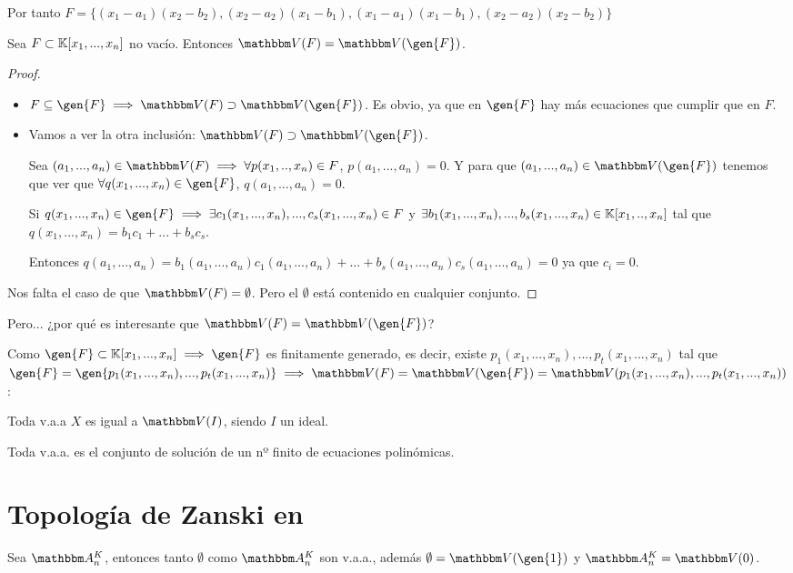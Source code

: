 \begin{example}
\begin{enumerate}
		Por tanto $F=\{ (x_1-a_1)(x_2-b_2), (x_2-a_2)(x_1-b_1), (x_1-a_1)(x_1-b_1), (x_2-a_2)(x_2-b_2)  \}$
	\end{enumerate}
\end{example}


\begin{prop}
	Sea $F \subset \mathbb{K}[x_1,...,x_n]$ no vacío. Entonces $\V(F)=\V(\gen{F})$.
\end{prop} 

\begin{proof}
	\begin{itemize}
		\item $F \subseteq \gen{F} \implies \V(F) \supset \V(\gen{F})$. Es obvio, ya que en $\gen{F}$ hay más ecuaciones que cumplir que en $F$.
		\item Vamos a ver la otra inclusión: $\V(F) \supset \V(\gen{F})$.
		
		Sea $(a_1,...,a_n) \in \V(F) \implies \forall p(x_1,..,x_n) \in F$, $p(a_1,...,a_n)=0$. Y para que $(a_1,...,a_n) \in \V(\gen{F})$ tenemos que ver que $\forall q(x_1,...,x_n)\in \gen{F}$, $q(a_1,...,a_n)=0$.
		
		Si $q(x_1,...,x_n)\in \gen{F} \implies \exists c_1(x_1,...,x_n),...,c_s(x_1,...,x_n) \in F$ y $\exists b_1(x_1,...,x_n),...,b_s(x_1,...,x_n) \in \mathbb{K}[x_1,..,x_n]$ tal que $q(x_1,...,x_n)=b_1c_1+...+b_sc_s$.
		
		Entonces $q(a_1,...,a_n)=b_1(a_1,...,a_n)c_1(a_1,...,a_n)+...+b_s(a_1,...,a_n)c_s(a_1,...,a_n) = 0$  ya que $c_i=0$.
	\end{itemize}
	
	Nos falta el caso de que $\V(F)=\emptyset$. Pero el $\emptyset$ está contenido en cualquier conjunto.
\end{proof}

Pero... ¿por qué es interesante que $\V(F)=\V(\gen{F})$?

Como $\gen{F}\subset \K[x_1,...,x_n] \implies \gen{F}$ es finitamente generado, es decir, existe $p_1(x_1,...,x_n),...,p_t(x_1,...,x_n)$ tal que $\gen{F} = \gen{p_1(x_1,...,x_n),...,p_t(x_1,...,x_n)} \implies \V(F)=\V(\gen{F})=\V(p_1(x_1,...,x_n),...,p_t(x_1,...,x_n))$:

\obs Toda v.a.a $X$ es igual a $\V(I)$, siendo $I$ un ideal.  

\obs Toda v.a.a. es el conjunto de solución de un nº finito de ecuaciones polinómicas.

\section{Topología de Zanski en \Akn}
Sea $\Akn$, entonces tanto $\emptyset$ como $\Akn$ son v.a.a., además $\emptyset=\V(\gen{1})$ y $\Akn=\V(0)$.


